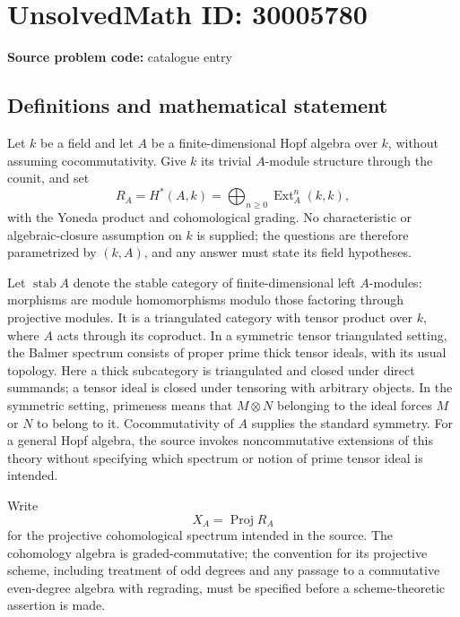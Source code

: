 \documentclass[11pt]{article}
\begin{document}
\section*{UnsolvedMath ID: 30005780}
\textbf{Source problem code:} catalogue entry
\subsection{Definitions and mathematical statement}
Let \(k\) be a field and let \(A\) be a finite-dimensional Hopf algebra over \(k\), without assuming cocommutativity. Give \(k\) its trivial \(A\)-module structure through the counit, and set
\[
R_A=H^*(A,k)=\bigoplus_{n\geq 0}\operatorname{Ext}^n_A(k,k),
\]
with the Yoneda product and cohomological grading. No characteristic or algebraic-closure assumption on \(k\) is supplied; the questions are therefore parametrized by \((k,A)\), and any answer must state its field hypotheses.

Let \(\operatorname{stab}A\) denote the stable category of finite-dimensional left \(A\)-modules: morphisms are module homomorphisms modulo those factoring through projective modules. It is a triangulated category with tensor product over \(k\), where \(A\) acts through its coproduct. In a symmetric tensor triangulated setting, the Balmer spectrum consists of proper prime thick tensor ideals, with its usual topology. Here a thick subcategory is triangulated and closed under direct summands; a tensor ideal is closed under tensoring with arbitrary objects. In the symmetric setting, primeness means that \(M\otimes N\) belonging to the ideal forces \(M\) or \(N\) to belong to it. Cocommutativity of \(A\) supplies the standard symmetry. For a general Hopf algebra, the source invokes noncommutative extensions of this theory without specifying which spectrum or notion of prime tensor ideal is intended.

Write
\[
X_A=\operatorname{Proj}R_A
\]
for the projective cohomological spectrum intended in the source. The cohomology algebra is graded-commutative; the convention for its projective scheme, including treatment of odd degrees and any passage to a commutative even-degree algebra with regrading, must be specified before a scheme-theoretic assertion is made.
\end{document}
